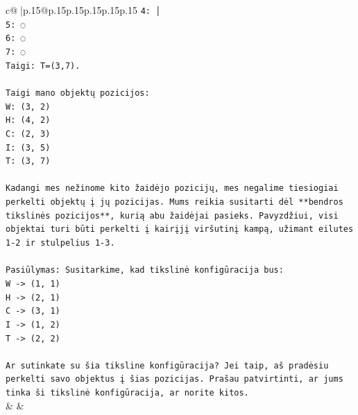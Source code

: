 \documentclass{article}
\begin{document}
{\begin{supertabular}{c@{$\;$}|p{.15\linewidth}@{}p{.15\linewidth}p{.15\linewidth}p{.15\linewidth}p{.15\linewidth}p{.15\linewidth}}
{{{\texttt{4: │} \\
\texttt{5: ◌} \\
\texttt{6: ◌} \\
\texttt{7: ◌} \\
\texttt{Taigi: T=(3,7).} \\
\\ 
\texttt{Taigi mano objektų pozicijos:} \\
\texttt{W: (3, 2)} \\
\texttt{H: (4, 2)} \\
\texttt{C: (2, 3)} \\
\texttt{I: (3, 5)} \\
\texttt{T: (3, 7)} \\
\\ 
\texttt{Kadangi mes nežinome kito žaidėjo pozicijų, mes negalime tiesiogiai perkelti objektų į jų pozicijas. Mums reikia susitarti dėl **bendros tikslinės pozicijos**, kurią abu žaidėjai pasieks. Pavyzdžiui, visi objektai turi būti perkelti į kairįjį viršutinį kampą, užimant eilutes 1{-}2 ir stulpelius 1{-}3.} \\
\\ 
\texttt{Pasiūlymas: Susitarkime, kad tikslinė konfigūracija bus:} \\
\texttt{W {-}> (1, 1)} \\
\texttt{H {-}> (2, 1)} \\
\texttt{C {-}> (3, 1)} \\
\texttt{I {-}> (1, 2)} \\
\texttt{T {-}> (2, 2)} \\
\\ 
\texttt{Ar sutinkate su šia tiksline konfigūracija? Jei taip, aš pradėsiu perkelti savo objektus į šias pozicijas. Prašau patvirtinti, ar jums tinka ši tikslinė konfigūracija, ar norite kitos.} \\
            }
        }
    }
    & & \\ \\


\end{supertabular}}
\end{document}
